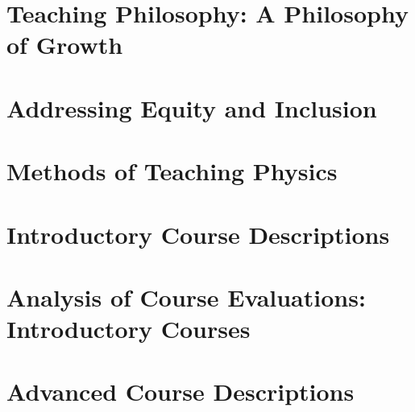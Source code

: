 \documentclass[../../main.tex]{subfiles}
\begin{document}
\section{Teaching Philosophy: A Philosophy of Growth}

\begin{flushleft}

\end{flushleft}

\section{Addressing Equity and Inclusion}

\begin{flushleft}

\end{flushleft}

\section{Methods of Teaching Physics}

\begin{flushleft}

\end{flushleft}

\section{Introductory Course Descriptions}

\begin{flushleft}

\end{flushleft}

\section{Analysis of Course Evaluations: Introductory Courses}

\begin{flushleft}

\end{flushleft}

\section{Advanced Course Descriptions}

\begin{flushleft}

\end{flushleft}
\end{document}
